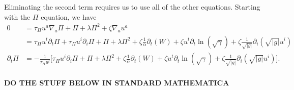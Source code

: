 \documentclass[12pt]{article}
\numberwithin{equation}{section}
\begin{document}
Eliminating the second term requires us to use all of the other equations.
Starting with the $\Pi$ equation, we have
\begin{equation}
\begin{aligned}
0 &= \tau_{\Pi} u^a \nabla_a \Pi + \Pi + \lambda \Pi^2 + \zeta \nabla_a u^a \\
&= \tau_{\Pi} u^t \partial_t \Pi + \tau_{\Pi} u^i \partial_i \Pi + \Pi + \lambda \Pi^2 + \zeta \frac{1}{\alpha} \partial_t ( W) + \zeta u^t \partial_t \ln(\sqrt{\gamma}) + \zeta \frac{1}{\sqrt{|g|}} \partial_i (\sqrt{|g|} u^i) \\
\partial_t \Pi &= - \frac{1}{\tau_{\Pi} u^t}\Big[ \tau_{\Pi} u^i \partial_i \Pi + \Pi + \lambda \Pi^2 + \zeta \frac{1}{\alpha} \partial_t ( W) + \zeta u^t \partial_t \ln(\sqrt{\gamma}) + \zeta \frac{1}{\sqrt{|g|}} \partial_i (\sqrt{|g|} u^i) \Big]. \\
\end{aligned}
\end{equation}

\textbf{DO THE STUFF BELOW IN STANDARD MATHEMATICA}
\end{document}
